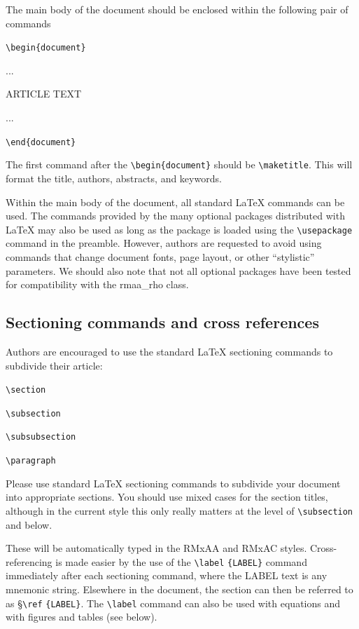 \documentclass[10pt,letter,twoside]{rmaa-rho-class/rmac-rho}
\newcommand{\CS}[1]{\texttt{\textbackslash #1}}
\begin{document}
The main body of the document should be enclosed within the following pair of commands

\bigskip
\CS{begin}\verb+{document}+

...

ARTICLE TEXT

...

\CS{end}\verb+{document}+
\bigskip

The first command after the \CS{begin}\verb+{document}+ should be \CS{maketitle}. This will format the title, authors, abstracts, and keywords.

Within the main body of the document, all standard \LaTeX{} commands can be used. The commands provided by the many optional packages distributed with \LaTeX{} may also be used as long as the package is loaded using the \CS{usepackage} command in the preamble. However, authors are requested to avoid using commands that change document fonts, page layout, or other ``stylistic'' parameters. We should also note that not all optional packages have been tested for compatibility with the rmaa\_rho class.

\subsection{Sectioning commands and cross references}

Authors are encouraged to use the standard \LaTeX{} sectioning commands to subdivide their article:

\bigskip

\CS{section}

\CS{subsection}

\CS{subsubsection}

\CS{paragraph}

\bigskip

Please use standard \LaTeX{} sectioning commands to subdivide your document into appropriate sections. You should use mixed cases for the section titles, although in the current style this only really matters at the level of \CS{subsection} and below.

These will be automatically typed in the RMxAA and RMxAC styles. Cross-referencing is made easier by the use of the \CS{label} 
 \verb+{LABEL}+ command immediately after each sectioning command, where the LABEL text is any mnemonic string. Elsewhere in the document, the section can then be referred to as \S \CS{ref} \verb+{LABEL}+. The \CS{label} command can also be used with equations and with figures and tables (see below). 
\end{document}
